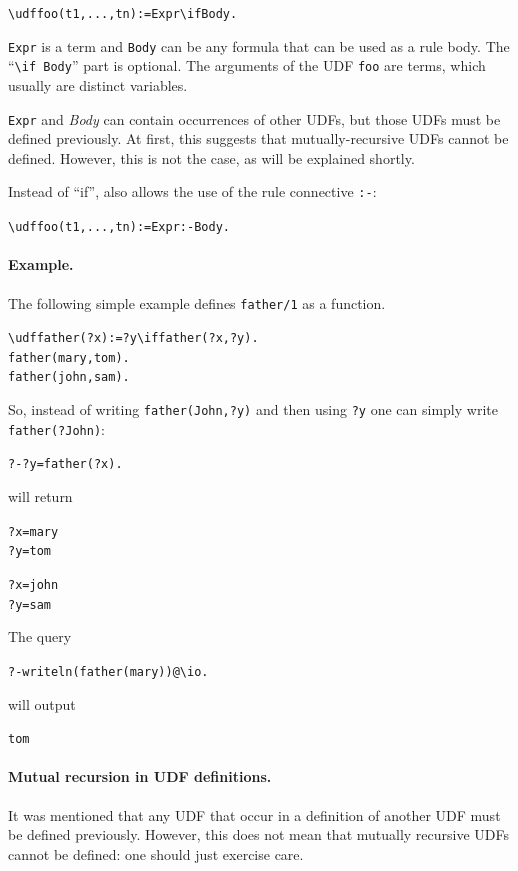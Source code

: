 \documentclass[11pt]{article}
\newcommand{\ERGO}{\mbox{\smaller{\ensuremath{\cal{E}}\smaller{{\sc{RGO}}}}}\xspace}
\newcommand{\FLSYSTEM}{\ERGO}
\newcommand{\bs}{\textbackslash}
\begin{document}
\begin{alltt}
    \bs{}udf foo(t1,...,tn) := Expr \bs{}if Body.
\end{alltt}

\noindent
\texttt{Expr} is a term and \texttt{Body} can be any formula that can be
used as a rule body.
The ``\texttt{\bs{}if Body}'' part is optional.
The arguments of the UDF \texttt{foo} are
terms, which usually are distinct variables.

\texttt{Expr} and \emph{Body} can contain occurrences of other UDFs, but those
UDFs must be defined previously. At first, this suggests that
mutually-recursive UDFs cannot be defined. However, this is not the case,
as will be explained shortly.

\medskip

\noindent
Instead of ``if'', \FLSYSTEM also allows the use of the rule connective
\texttt{:-}: 
\begin{alltt}
    \bs{}udf foo(t1,...,tn) := Expr :- Body.
\end{alltt}

\paragraph{Example.}
The following simple example defines \texttt{father/1} as a function.
\begin{alltt}
    \bs{}udf father(?x):=?y \bs{}if father(?x,?y).
    father(mary,tom).
    father(john,sam).
\end{alltt}

So, instead of writing \texttt{father(John,?y)}  and then using \texttt{?y}
one can simply write \texttt{father(?John)}:  
\begin{alltt}
    ?- ?y=father(?x).
\end{alltt}
will return
\begin{alltt}
    ?x=mary
    ?y=tom

    ?x=john
    ?y=sam
\end{alltt}
The query
\begin{alltt}
    ?- writeln(father(mary))@\bs{}io.
\end{alltt}
will output
\begin{alltt}
    tom
\end{alltt}

\paragraph{Mutual recursion in UDF definitions.}
It was mentioned that any UDF that occur in a definition of another UDF
must be defined previously. However, this does not mean that mutually
recursive UDFs cannot be defined: one should just exercise care.
\end{document}
